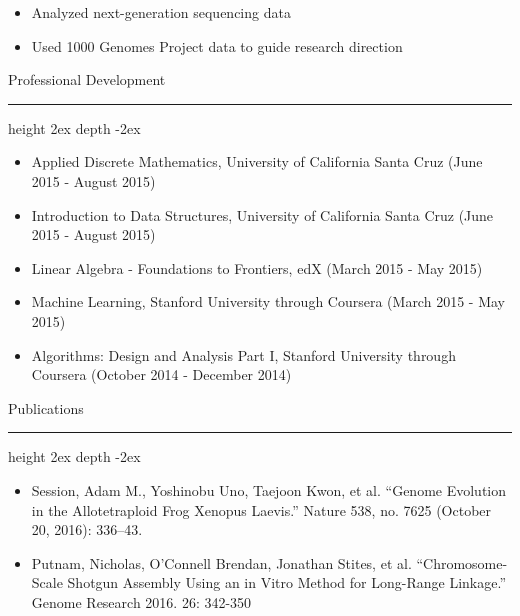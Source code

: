 \documentclass[12]{article}
\newcommand\sectionline{\par\leavevmode\leaders\hrule height 2ex depth \dimexpr0.4pt-2ex\hfill\kern0pt\par}
\begin{document}
\begin{itemize}
\item Analyzed next-generation sequencing data
\item Used 1000 Genomes Project data to guide research direction
\end{itemize}

{\Large Professional Development}\sectionline
\begin{itemize}
\item Applied Discrete Mathematics, University of California Santa Cruz (June 2015 - August 2015)
\item Introduction to Data Structures, University of California Santa Cruz (June 2015 - August 2015)
\item Linear Algebra - Foundations to Frontiers, edX (March 2015 - May 2015)
\item Machine Learning, Stanford University through Coursera (March 2015 - May 2015)
\item Algorithms: Design and Analysis Part I, Stanford University through Coursera (October 2014 - December 2014)
\end{itemize}

{\Large Publications}\sectionline
\begin{itemize}
\item Session, Adam M., Yoshinobu Uno, Taejoon Kwon, et al. “Genome Evolution in the Allotetraploid Frog Xenopus
Laevis.” Nature 538, no. 7625 (October 20, 2016): 336–43.
\item Putnam, Nicholas, O’Connell Brendan, Jonathan Stites, et al. “Chromosome-Scale Shotgun Assembly Using an in
Vitro Method for Long-Range Linkage.” Genome Research 2016. 26: 342-350
\end{itemize}
\end{document}

